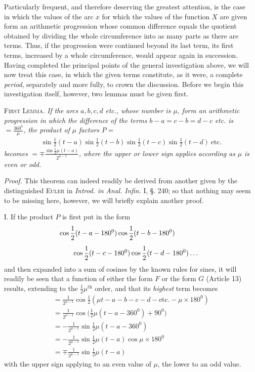 \begingroup
\renewcommand{\arraystretch}{1.45}
Particularly frequent, and therefore deserving the greatest attention, is the case in which
the values of the arc \(x\) for which the values of the function \(X\) are given form an arithmetic progression whose common difference equals the quotient obtained
by dividing the whole circumference into as many parts as there are terms. Thus, if
the progression were continued beyond its last term, its first terms, increased by a whole circumference, would appear again in succession. Having completed the principal points of the general investigation above, we will now treat this case, in which
the given terms constitute, as it were, a complete \emph{period}, separately and more fully, to crown the discussion. Before we begin this investigation itself, however, two
lemmas must be given first.

\textsc{First Lemma.} \emph{If the arcs \(a,b,c,d\) etc., whose number is \(\mu\), form
an arithmetic progression in which the difference of the terms \(b-a=c-b=d-c\)
etc. is \(=\frac{360^{0}}{\mu}\), the product of \(\mu\) factors \(P=\)}
\[
\begin{aligned}
&\sin\frac12(t-a)\sin\frac12(t-b)\sin\frac12(t-c)\sin\frac12(t-d)\ \mathrm{etc.}
\end{aligned}
\]
\noindent\emph{becomes \(=\mp\frac{\sin\frac12\mu(t-a)}{2^{\mu-1}}\), where the upper or lower sign applies according as \(\mu\) is even or odd.}

\emph{Proof.} This theorem can indeed readily be derived from another given by the distinguished \textsc{Euler} in \emph{Introd. in Anal. Infin.} I, \S. 240; so that nothing may seem to be missing here, however, we will briefly explain another proof.

I. If the product \(P\) is first put in the form
\[
\begin{aligned}
&\cos\frac12(t-a-180^{0})\cos\frac12(t-b-180^{0})\\[5pt]&\qquad\cos\frac12(t-c-180^{0})\cos\frac12(t-d-180^{0})\mathinner{.\,.\,.}
\end{aligned}
\]
\noindent and then expanded into a sum of cosines by the known rules for sines, it will readily be seen that a function of either the form \(F\) or the form \(G\)
(Article 13) results, extending to the \(\frac12\mu^{\mathrm{th}}\) order, and that its \emph{highest} term becomes
\[
\begin{aligned}
&=\frac{1}{2^{\mu-1}}\cos\frac12(\mu t-a-b-c-d-\mathrm{etc.}-\mu\times180^{0})\\[5pt]
&=\frac{1}{2^{\mu-1}}\cos\bigl(\frac12\mu(t-a-360^{0})+90^{0}\bigr)\\[5pt]
&=-\frac{1}{2^{\mu-1}}\sin\frac12\mu(t-a-360^{0})\\[5pt]
&=-\frac{1}{2^{\mu-1}}\sin\frac12\mu(t-a)\cos\mu\times180^{0}\\[5pt]
&=\mp\frac{1}{2^{\mu-1}}\sin\frac12\mu(t-a)
\end{aligned}
\]
\noindent with the upper sign applying to an even value of \(\mu\), the lower to an odd value.

